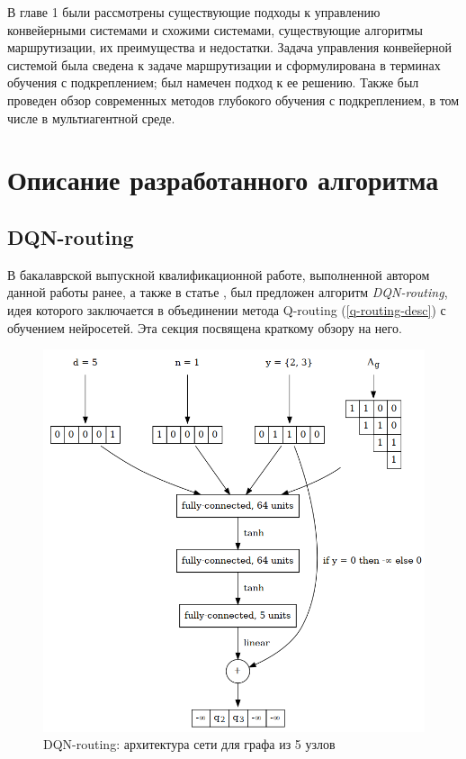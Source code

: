 \documentclass[specification,annotation,times]{itmo-student-thesis}
\theoremstyle{definition}
\begin{document}
\chapterconclusion

В главе 1 были рассмотрены существующие подходы к управлению конвейерными
системами и схожими системами, существующие алгоритмы маршрутизации, их преимущества
и недостатки. Задача управления конвейерной системой была сведена к задаче
маршрутизации и сформулирована в терминах обучения с подкреплением; был намечен
подход к ее решению. Также был проведен обзор современных методов глубокого
обучения с подкреплением, в том числе в мультиагентной среде.

\finishrelatedwork

\chapter{Описание разработанного алгоритма}

\section{DQN-routing}

В бакалаврской выпускной квалификационной работе, выполненной автором данной
работы ранее, а также в статье \cite{mukhutdinov2019multi}, был предложен
алгоритм \textit{DQN-routing}, идея которого заключается в объединении метода
Q-routing (\ref{q-routing-desc}) с обучением нейросетей. Эта секция посвящена
краткому обзору на него.

\begin{figure}[!h]
  \caption{DQN-routing: архитектура сети для графа из 5 узлов}\label{nn-pic-2}
  \centering
  \includegraphics[scale=0.5]{nn-2}
\end{figure}
\end{document}
